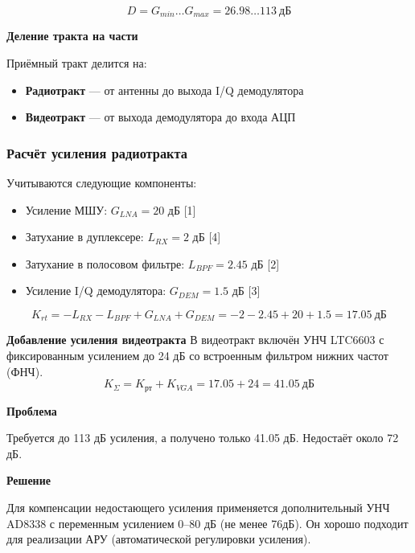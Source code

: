 \documentclass[a4paper,12pt]{article}
\begin{document}
\begin{equation}
D = G_{min} \ldots G_{max} = 26.98 \ldots 113\ \text{дБ}
\end{equation}

\textbf{Деление тракта на части}

Приёмный тракт делится на:
\begin{itemize}
\item \textbf{Радиотракт} — от антенны до выхода I/Q демодулятора
\item \textbf{Видеотракт} — от выхода демодулятора до входа АЦП
\end{itemize}

\subsubsection{Расчёт усиления радиотракта}

Учитываются следующие компоненты:
\begin{itemize}
\item Усиление МШУ: $G_{LNA} = 20$ дБ [1]
\item Затухание в дуплексере: $L_{RX} = 2$ дБ [4]
\item Затухание в полосовом фильтре: $L_{BPF} = 2.45$ дБ [2]
\item Усиление I/Q демодулятора: $G_{DEM} = 1.5$ дБ [3]
\end{itemize}

\begin{equation}
K_{rt} = -L_{RX} - L_{BPF} + G_{LNA} + G_{DEM} = -2 - 2.45 + 20 + 1.5 = 17.05\ \text{дБ}
\end{equation}

\textbf{Добавление усиления видеотракта} 
В видеотракт включён УНЧ LTC6603 с фиксированным усилением до 24 дБ со встроенным фильтром нижних частот (ФНЧ).
\begin{equation}
K_\Sigma = K_{рт} + K_{VGA} = 17.05 + 24 = 41.05\ \text{дБ}
\end{equation}
 

\textbf{Проблема}

Требуется до 113 дБ усиления, а получено только 41.05 дБ. Недостаёт около 72 дБ.

\textbf{Решение }

Для компенсации недостающего усиления применяется дополнительный УНЧ AD8338 с переменным усилением 0–80 дБ (не менее 76дБ). Он хорошо подходит для реализации АРУ (автоматической регулировки усиления).
\end{document}
